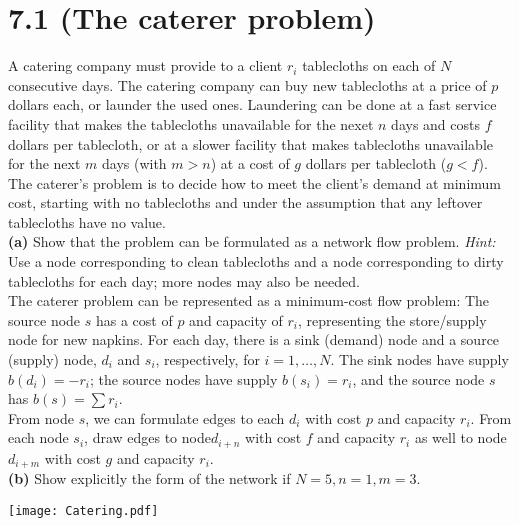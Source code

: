 \documentclass{article}
\begin{document}


\section*{7.1 (The caterer problem)}
A catering company must provide to a client $r_i$ tablecloths on each of $N$ consecutive days.  The catering company can buy new tablecloths at a price of $p$ dollars each, or launder the used ones.  Laundering can be done at a fast service facility that makes the tablecloths unavailable for the nexet $n$ days and costs $f$ dollars per tablecloth, or at a slower facility that makes tablecloths unavailable for the next $m$ days (with $m > n$) at a cost of $g$ dollars per tablecloth ($g < f$).  The caterer's problem is to decide how to meet the  client's demand at minimum cost, starting with no tablecloths and under the assumption that any leftover tablecloths have no value. \\

\noindent \textbf{(a)}
Show that the problem can be formulated as a network flow problem.  \emph{Hint:}  Use a node corresponding to clean tablecloths and a node corresponding to dirty tablecloths for each day; more nodes may also be needed. \\

\noindent
The caterer problem can be represented as a minimum-cost flow problem:  The source node $s$ has a cost of $p$ and capacity of $r_i$, representing the store/supply node for new napkins.  For each day, there is a sink (demand) node and a source (supply) node, $d_i$ and $s_i$, respectively, for $i = 1, \ldots, N$.   The sink nodes have supply $b(d_i) = -r_i$; the source nodes have supply $b(s_i) = r_i$, and the source node $s$ has $b(s) = \sum r_i$.\\
 
\noindent 
From node $s$, we can formulate edges to each $d_i$ with cost $p$ and capacity $r_i$.  From each node $s_i$, draw edges to node$d_{i+n}$ with cost $f$ and capacity $r_i$ as well to node $d_{i+m}$ with  cost $g$ and capacity $r_i$. \\

\noindent \textbf{(b)}
Show explicitly the form of the network if $N = 5, n=1, m=3$.   \\

\begin{center}
\texttt{[image: Catering.pdf]}
\end{center}

\pagebreak
\end{document}
